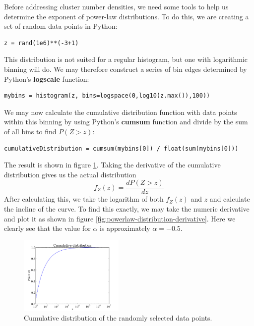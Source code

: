 \documentclass[a4paper,reprint,floatfix,amsmath,amssymb,aps,pra]{revtex4-1}
\begin{document}
Before addressing cluster number densities, we need some tools to help us determine the exponent of power-law distributions. To do this, we are creating a set of random data points in Python:
\begin{lstlisting}
z = rand(1e6)**(-3+1)
\end{lstlisting}
This distribution is not suited for a regular histogram, but one with logarithmic binning will do. We may therefore construct a series of bin edges determined by Python's \textbf{logscale} function:
\begin{lstlisting}
mybins = histogram(z, bins=logspace(0,log10(z.max()),100))
\end{lstlisting}
We may now calculate the cumulative distribution function with data points within this binning by using Python's \textbf{cumsum} function and divide by the sum of all bins to find $P(Z > z)$:
\begin{lstlisting}
cumulativeDistribution = cumsum(mybins[0]) / float(sum(mybins[0]))
\end{lstlisting}
The result is shown in figure \ref{fig:powerlaw-cumulative-distribution}. Taking the derivative of the cumulative distribution gives us the actual distribution
\begin{equation}
  f_{Z}(z) = \frac{dP(Z > z)}{dz}
\end{equation} 
After calculating this, we take the logarithm of both $f_{Z}(z)$ and $z$ and calculate the incline of the curve. To find this exactly, we may take the numeric derivative and plot it as shown in figure \ref{fig:powerlaw-distribution-derivative}. Here we clearly see that the value for $\alpha$ is approximately $\alpha = -0.5$.
\begin{figure}
  \centering
  \includegraphics[width=0.45\textwidth]{../percolation/results/1c/cumulative-distribution.pdf}
  \caption{Cumulative distribution of the randomly selected data points.}
  \label{fig:powerlaw-cumulative-distribution}
\end{figure}
\end{document}
